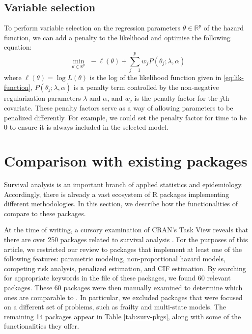 \hypertarget{variable-selection}{%
\subsection{Variable selection}\label{variable-selection}}

To perform variable selection on the regression parameters
\(\theta \in \mathbb{R}^p\) of the hazard function, we can add a penalty
to the likelihood and optimise the following equation: \begin{equation}
\min _{\theta \in \mathbb{R}^{p}}\,\,-\ell\left(\theta\right)+\sum_{j=1}^p w_j P(\theta_j;\lambda,\alpha) \label{eq:penest}
\end{equation} where \(\ell\left(\theta\right) = \log L(\theta)\) is the
log of the likelihood function given in \eqref{eq:lik-function},
\(P(\theta_j;\lambda,\alpha)\) is a penalty term controlled by the
non-negative regularization parameters \(\lambda\) and \(\alpha\), and
\(w_j\) is the penalty factor for the \(j\)th covariate. These penalty
factors serve as a way of allowing parameters to be penalized
differently. For example, we could set the penalty factor for time to be
0 to ensure it is always included in the selected model.

\hypertarget{comparison-with-existing-packages}{%
\section{Comparison with existing
packages}\label{comparison-with-existing-packages}}

Survival analysis is an important branch of applied statistics and
epidemiology. Accordingly, there is already a vast ecosystem of R
packages implementing different methodologies. In this section, we
describe how the functionalities of  compare to these
packages.

At the time of writing, a cursory examination of CRAN's 
Task View reveals that there are over 250 packages related to survival
analysis \citep{survTaskView}. For the purposes of this article, we
restricted our review to packages that implement at least one of the
following features: parametric modeling, non-proportional hazard models,
competing risk analysis, penalized estimation, and CIF estimation. By
searching for appropriate keywords in the  file of
these packages, we found 60 relevant packages. These 60 packages were
then manually examined to determine which ones are comparable to
. In particular, we excluded packages that were focused on
a different set of problems, such as frailty and multi-state models. The
remaining 14 packages appear in Table \ref{tab:surv-pkgs}, along with
some of the functionalities they offer.


